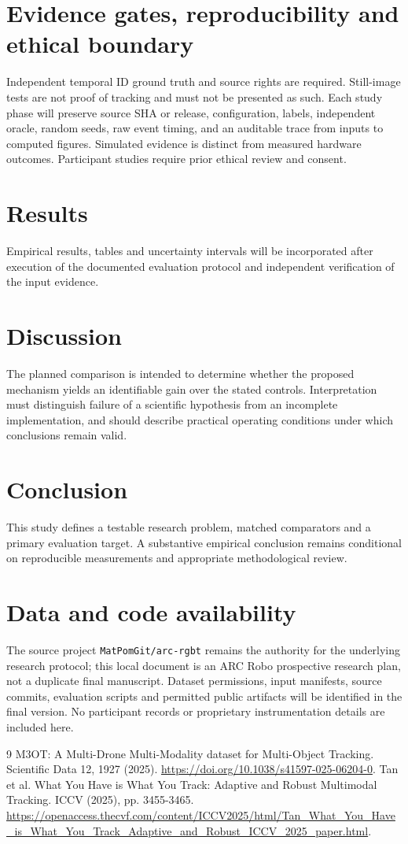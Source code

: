 \documentclass[11pt,a4paper]{article}
\begin{document}
\section{Evidence gates, reproducibility and ethical boundary}
Independent temporal ID ground truth and source rights are required. Still-image tests are not proof of tracking and must not be presented as such. Each study phase will preserve source SHA or release, configuration, labels, independent oracle, random seeds, raw event timing, and an auditable trace from inputs to computed figures. Simulated evidence is distinct from measured hardware outcomes. Participant studies require prior ethical review and consent.

\section{Results}
Empirical results, tables and uncertainty intervals will be incorporated after execution of the documented evaluation protocol and independent verification of the input evidence.

\section{Discussion}
The planned comparison is intended to determine whether the proposed mechanism yields an identifiable gain over the stated controls. Interpretation must distinguish failure of a scientific hypothesis from an incomplete implementation, and should describe practical operating conditions under which conclusions remain valid.

\section{Conclusion}
This study defines a testable research problem, matched comparators and a primary evaluation target. A substantive empirical conclusion remains conditional on reproducible measurements and appropriate methodological review.

\section{Data and code availability}
The source project \texttt{MatPomGit/arc-rgbt} remains the authority for the underlying research protocol; this local document is an ARC Robo prospective research plan, not a duplicate final manuscript. Dataset permissions, input manifests, source commits, evaluation scripts and permitted public artifacts will be identified in the final version. No participant records or proprietary instrumentation details are included here.
\begin{thebibliography}{9}
 M3OT: A Multi-Drone Multi-Modality dataset for Multi-Object Tracking. Scientific Data 12, 1927 (2025). \url{https://doi.org/10.1038/s41597-025-06204-0}.
 Tan et al. What You Have is What You Track: Adaptive and Robust Multimodal Tracking. ICCV (2025), pp. 3455-3465. \url{https://openaccess.thecvf.com/content/ICCV2025/html/Tan_What_You_Have_is_What_You_Track_Adaptive_and_Robust_ICCV_2025_paper.html}.
\end{thebibliography}
\end{document}
